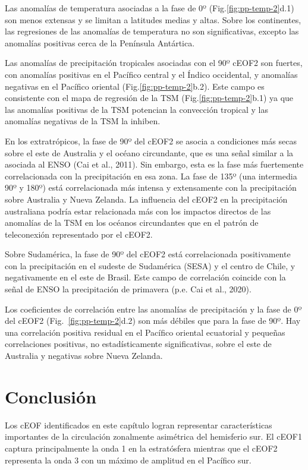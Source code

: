 \documentclass[12pt,oneside]{reedthesis}
\begin{document}
Las anomalías de temperatura asociadas a la fase de 0º (Fig.\ref{fig:pp-temp-2}d.1) son menos extensas y se limitan a latitudes medias y altas.
Sobre los continentes, las regresiones de las anomalías de temperatura no son significativas, excepto las anomalías positivas cerca de la Península Antártica.

Las anomalías de precipitación tropicales asociadas con el 90º cEOF2 son fuertes, con anomalías positivas en el Pacífico central y el Índico occidental, y anomalías negativas en el Pacífico oriental (Fig.\ref{fig:pp-temp-2}b.2).
Este campo es consistente con el mapa de regresión de la TSM (Fig.\ref{fig:pp-temp-2}b.1) ya que las anomalías positivas de la TSM potencian la convección tropical y las anomalías negativas de la TSM la inhiben.

En los extratrópicos, la fase de 90º del cEOF2 se asocia a condiciones más secas sobre el este de Australia y el océano circundante, que es una señal similar a la asociada al ENSO (Cai et al., 2011).
Sin embargo, esta es la fase más fuertemente correlacionada con la precipitación en esa zona.
La fase de 135º (una intermedia 90º y 180º) está correlacionada más intensa y extensamente con la precipitación sobre Australia y Nueva Zelanda.
La influencia del cEOF2 en la precipitación australiana podría estar relacionada más con los impactos directos de las anomalías de la TSM en los océanos circundantes que en el patrón de teleconexión representado por el cEOF2.

Sobre Sudamérica, la fase de 90º del cEOF2 está correlacionada positivamente con la precipitación en el sudeste de Sudamérica (SESA) y el centro de Chile, y negativamente en el este de Brasil.
Este campo de correlación coincide con la señal de ENSO la precipitación de primavera (p.e. Cai et al., 2020).

Los coeficientes de correlación entre las anomalías de precipitación y la fase de 0º del cEOF2 (Fig.~\ref{fig:pp-temp-2}d.2) son más débiles que para la fase de 90º.
Hay una correlación positiva residual en el Pacífico oriental ecuatorial y pequeñas correlaciones positivas, no estadísticamente significativas, sobre el este de Australia y negativas sobre Nueva Zelanda.

\hypertarget{conclusiuxf3n}{%
\section{Conclusión}\label{conclusiuxf3n}}

Los cEOF identificados en este capítulo logran representar características importantes de la circulación zonalmente asimétrica del hemisferio sur.
El cEOF1 captura principalmente la onda 1 en la estratósfera mientras que el cEOF2 representa la onda 3 con un máximo de amplitud en el Pacífico sur.
\end{document}
